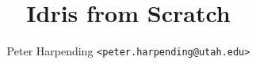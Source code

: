 \documentclass[12pt,letterpaper,oneside]{memoir}
\theoremstyle{plain}
\theoremstyle{definition}
\begin{document}
\title{Idris from Scratch}
\author{Peter Harpending \texttt{<peter.harpending@utah.edu>}}
\maketitle

\tableofcontents



\printbibliography
\end{document}
